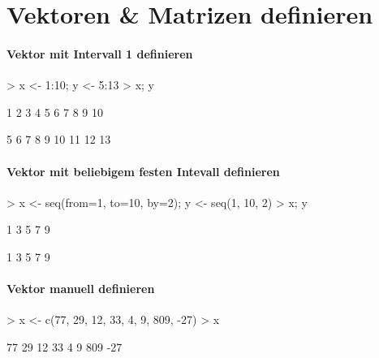 \begin{lstlisting}

\end{lstlisting}

\section{Vektoren \& Matrizen definieren}
\paragraph{Vektor mit Intervall 1 definieren}
\begin{Schunk}
\begin{Sinput}
> x <- 1:10; y <- 5:13
> x; y
\end{Sinput}
\begin{Soutput}
 [1]  1  2  3  4  5  6  7  8  9 10
\end{Soutput}
\begin{Soutput}
[1]  5  6  7  8  9 10 11 12 13
\end{Soutput}
\end{Schunk}

\paragraph{Vektor mit beliebigem festen Intevall definieren}
\begin{Schunk}
\begin{Sinput}
> x <- seq(from=1, to=10, by=2); y <- seq(1, 10, 2)
> x; y
\end{Sinput}
\begin{Soutput}
[1] 1 3 5 7 9
\end{Soutput}
\begin{Soutput}
[1] 1 3 5 7 9
\end{Soutput}
\end{Schunk}

\paragraph{Vektor manuell definieren}
\begin{Schunk}
\begin{Sinput}
> x <- c(77, 29, 12, 33, 4, 9, 809, -27)
> x
\end{Sinput}
\begin{Soutput}
[1]  77  29  12  33   4   9 809 -27
\end{Soutput}
\end{Schunk}

